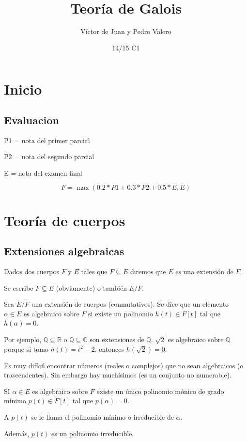 \documentclass{apuntes}
\title{Teoría de Galois}
\author{Víctor de Juan y Pedro Valero}
\date{14/15 C1}
\begin{document}
\pagestyle{plain}
\maketitle

\tableofcontents
\newpage

\chapter{Inicio}

\section{Evaluacion}
P1 = nota del primer parcial

P2 = nota del segundo parcial

E = nota del examen final

$$F = \max(0.2*P1+0.3*P2+0.5*E, E)$$

\chapter{Teoría de cuerpos}

\section{Extensiones algebraicas}

\begin{defn}
Dados dos cuerpos $F$ y $E$ tales que $F⊆E$ diremos que $E$ es una extensión de $F$.

Se escribe $F⊆E$ (obviamente) o también $E/F$.
\end{defn}

\begin{defn}
Sea $E/F$ una extensión de cuerpos (conmutativos). Se dice que un elemento $α∈E$ es algebraico sobre $F$ si existe un polinomio $h(t) ∈ F[t]$ tal que $h(α) = 0$.
\end{defn}

Por ejemplo, $ℚ⊆ℝ$ o $ℚ⊆ℂ$ son extensiones de $ℚ$. $\sqrt{2}$ es algebraico sobre $ℚ$ porque si tomo $h(t) = t^2 - 2$, entonces $h(\sqrt{2}) = 0$.

Es muy difícil encontrar números (reales o complejos) que no sean algebraicos (o trascendentes). Sin embargo hay muchísimos (es un conjunto no numerable).

\begin{prop} SI $α∈E$ es algebraico sobre $F$ existe un único polinomio mónico de grado mínimo $p(t) ∈ F[t]$ tal que $p(α) = 0$.

A $p(t)$ se le llama el polinomio mínimo o irreducible de $α$.

Además, $p(t)$ es un polinomio irreducible.
\end{prop}
\end{document}
